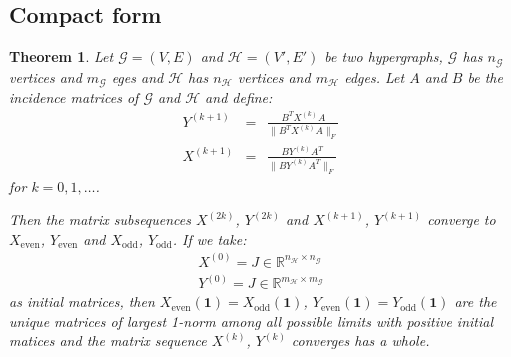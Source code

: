 \documentclass[a4paper,11pt]{report}
\newtheorem{theorem}{Theorem}[section]
\newcommand{\R}{{\mathbb R}}
\newcommand{\graf}{\mathscr{G}}
\newcommand{\grafeen}{\mathscr{H}}
\newcommand{\hgraf}{\mathcal{G}}
\newcommand{\hgrafeen}{\mathcal{H}}
\begin{document}
\subsection{Compact form}
 \begin{theorem}\label{incidencegrootbewijs}
   Let $\hgraf=(V,E)$ and $\hgrafeen=(V',E')$ be two hypergraphs, $\hgraf$ has $n_\hgraf$ 
   vertices and $m_\hgraf$ eges and $\hgrafeen$ has $n_\hgrafeen$ vertices and $m_\hgrafeen$ 
   edges. Let $A$ and $B$ be the incidence matrices of $\hgraf$ and $\hgrafeen$ 
   and define:
 \begin{eqnarray}
  Y^{(k+1)} &=& \frac{B^TX^{(k)}A}{\|B^TX^{(k)}A\|_F}\\
   X^{(k+1)} &=& \frac{BY^{(k)}A^T}{\|BY^{(k)}A^T\|_F}
 \end{eqnarray}
  for  $k =  0,1,\ldots$.
  
  Then the matrix subsequences $X^{(2k)}$, $Y^{(2k)}$ and $X^{(k+1)}$, $Y^{(k+1)}$ 
  converge to $X_{\text{even}}$, $Y_{\text{even}}$ and $X_{\text{odd}}$, 
  $Y_{\text{odd}}$. If we take:
  \begin{eqnarray*}  X^{(0)} = J \in \R^{n_\grafeen \times n_\graf}\\
    Y^{(0)} = J \in \R^{m_\grafeen \times m_\graf}
  \end{eqnarray*}
 as initial matrices, then $X_{\text{even}}(\mathbf{1})=X_{\text{odd}}(\mathbf{1})$, $Y_{\text{even}}(\mathbf{1})= Y_{\text{odd}}(\mathbf{1})$ 
 are the unique matrices of largest 1-norm among all possible limits with positive 
 initial matices and the matrix sequence $X^{(k)}$, $Y^{(k)}$ converges has a 
 whole.
  \end{theorem}
\end{document}
